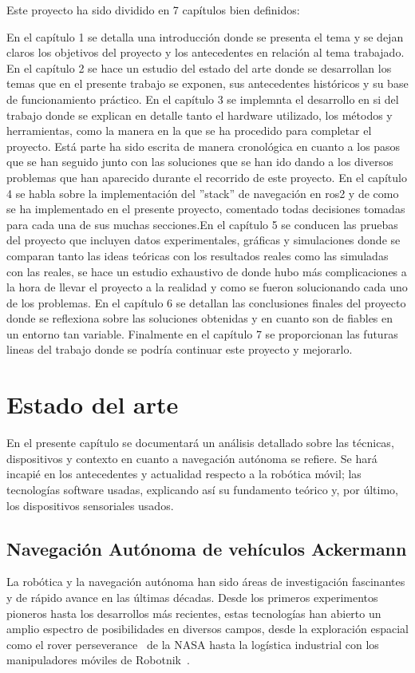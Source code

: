 Este proyecto ha sido dividido en 7 capítulos bien definidos:

En el capítulo 1 se detalla una introducción donde se presenta el tema y se dejan claros los objetivos del proyecto y los antecedentes en relación al tema 
trabajado. En el capítulo 2 se hace un estudio del estado del arte donde se desarrollan los temas que en el presente trabajo se exponen, sus antecedentes históricos y su base de 
funcionamiento práctico. En el capítulo 3 se implemnta el desarrollo en si del trabajo donde se explican en detalle tanto el hardware utilizado, los métodos y herramientas, como la manera en la que 
se ha procedido para completar el proyecto. Está parte ha sido escrita de manera cronológica en cuanto a los pasos que se han seguido junto 
con las soluciones que se han ido dando a los diversos problemas que han aparecido durante el recorrido de este proyecto. En el capítulo 4 se habla sobre la implementación 
del ''stack'' de navegación en ros2 y de como se ha implementado en el presente proyecto, comentado todas decisiones tomadas para cada una de sus muchas secciones.En el capítulo 5 se conducen las pruebas del proyecto que incluyen datos experimentales, gráficas y simulaciones donde se comparan tanto las ideas teóricas con 
los resultados reales como las simuladas con las reales, se hace un estudio exhaustivo de donde hubo más complicaciones a la hora de llevar 
el proyecto a la realidad y como se fueron solucionando cada uno de los problemas. En el capítulo 6 se detallan las conclusiones finales del proyecto donde se reflexiona sobre las soluciones obtenidas y en cuanto son de fiables en un entorno tan 
variable. Finalmente en el capítulo 7 se proporcionan las futuras lineas del trabajo donde se podría continuar este proyecto y mejorarlo.

\chapter{Estado del arte}

En el presente capítulo se documentará un análisis detallado sobre las técnicas, dispositivos y contexto en cuanto 
a navegación autónoma se refiere. Se hará incapié en los antecedentes y actualidad respecto a la robótica móvil; 
las tecnologías software usadas, explicando así su fundamento teórico y, por último, los dispositivos 
sensoriales usados.

\section{Navegación Autónoma de vehículos Ackermann}
La robótica y la navegación autónoma han sido áreas de investigación fascinantes y de rápido avance en las últimas décadas. 
Desde los primeros experimentos pioneros hasta los desarrollos más recientes, estas tecnologías han abierto un amplio espectro de 
posibilidades en diversos campos, desde la exploración espacial como el rover perseverance~\Cite{nasa24} de la NASA hasta la logística 
industrial con los manipuladores móviles de Robotnik~\Cite{robotnik24}.

